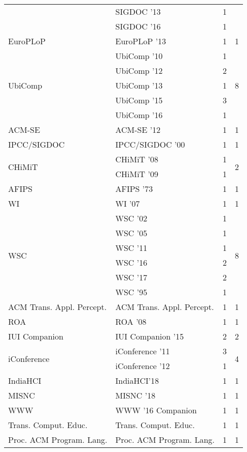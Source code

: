 \begin{table*}[t]
\begin{tabular}{llrr}
& SIGDOC '13 & 1 &\\
& SIGDOC '16 & 1 &\\
\multirow{1}{*}{EuroPLoP } & EuroPLoP '13 & 1 & \multirow{1}{*}{1}\\
\multirow{5}{*}{UbiComp } & UbiComp '10 & 1 & \multirow{5}{*}{8}\\
& UbiComp '12 & 2 &\\
& UbiComp '13 & 1 &\\
& UbiComp '15 & 3 &\\
& UbiComp '16 & 1 &\\
\multirow{1}{*}{ACM-SE } & ACM-SE '12 & 1 & \multirow{1}{*}{1}\\
\multirow{1}{*}{IPCC/SIGDOC } & IPCC/SIGDOC '00 & 1 & \multirow{1}{*}{1}\\
\multirow{2}{*}{CHiMiT } & CHiMiT '08 & 1 & \multirow{2}{*}{2}\\
& CHiMiT '09 & 1 &\\
\multirow{1}{*}{AFIPS } & AFIPS '73 & 1 & \multirow{1}{*}{1}\\
\multirow{1}{*}{WI } & WI '07 & 1 & \multirow{1}{*}{1}\\
\multirow{6}{*}{WSC } & WSC '02 & 1 & \multirow{6}{*}{8}\\
& WSC '05 & 1 &\\
& WSC '11 & 1 &\\
& WSC '16 & 2 &\\
& WSC '17 & 2 &\\
& WSC '95 & 1 &\\
\multirow{1}{*}{ACM Trans. Appl. Percept.} & ACM Trans. Appl. Percept. & 1 & \multirow{1}{*}{1}\\
\multirow{1}{*}{ROA } & ROA '08 & 1 & \multirow{1}{*}{1}\\
\multirow{1}{*}{IUI Companion } & IUI Companion '15 & 2 & \multirow{1}{*}{2}\\
\multirow{2}{*}{iConference } & iConference '11 & 3 & \multirow{2}{*}{4}\\
& iConference '12 & 1 &\\
\multirow{1}{*}{IndiaHCI} & IndiaHCI'18 & 1 & \multirow{1}{*}{1}\\
\multirow{1}{*}{MISNC } & MISNC '18 & 1 & \multirow{1}{*}{1}\\
\multirow{1}{*}{WWW } & WWW '16 Companion & 1 & \multirow{1}{*}{1}\\
\multirow{1}{*}{Trans. Comput. Educ.} & Trans. Comput. Educ. & 1 & \multirow{1}{*}{1}\\
\multirow{1}{*}{Proc. ACM Program. Lang.} & Proc. ACM Program. Lang. & 1 & \multirow{1}{*}{1}\\

\end{tabular}
\end{table*}
